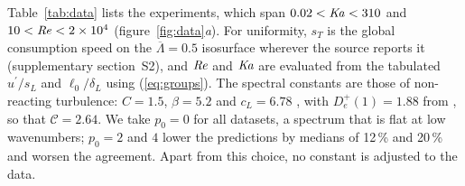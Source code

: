 \documentclass[lineno]{jfm}
\providecommand{\Rey}{\mbox{\textit{Re}}}
\providecommand{\Ka}{\mbox{\textit{Ka}}}
\newcommand{\sL}{s_L}
\newcommand{\dL}{\delta_L}
\newcommand{\Cs}{\mathcal{C}}
\newcommand{\De}{D_e^{+}}
\newcommand{\up}{u^{\prime}}
\begin{document}

Table~\ref{tab:data} lists the experiments, which span $0.02 < \Ka < 310$ and $10 < \Rey < 2 \times 10^4$ (figure~\ref{fig:data}\textit{a}). For uniformity, $s_T$ is the global consumption speed on the $\overline{\Lambda} = 0.5$ isosurface wherever the source reports it (supplementary section~S2), and $\Rey$ and $\Ka$ are evaluated from the tabulated $\up / \sL$ and $\ell_0 / \dL$ using (\ref{eq:groups}). The spectral constants are those of non-reacting turbulence: $C = 1.5$, $\beta = 5.2$ and $c_L = 6.78$ \citep{Pope2000}, with $\De(1) = 1.88$ from \citet{Chollet1984}, so that $\Cs = 2.64$. We take $p_0 = 0$ for all datasets, a spectrum that is flat at low wavenumbers; $p_0 = 2$ and $4$ lower the predictions by medians of 12\,\% and 20\,\% and worsen the agreement. Apart from this choice, no constant is adjusted to the data.
\end{document}
